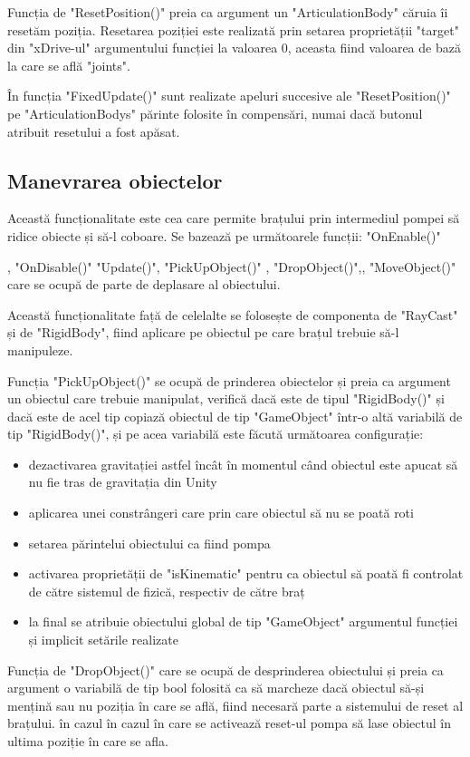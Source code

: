 Funcția de "ResetPosition()" preia ca argument un "ArticulationBody" căruia îi resetăm poziția. Resetarea poziției este realizată prin setarea proprietății "target" din "xDrive-ul" argumentului funcției la valoarea  0, aceasta fiind valoarea de bază la care se află "joints".

În funcția "FixedUpdate()" sunt realizate apeluri succesive ale "ResetPosition()" pe "ArticulationBodys"  părinte folosite în compensări, numai dacă butonul atribuit resetului a fost apăsat.


\subsection{Manevrarea obiectelor}
Această funcționalitate este cea care permite brațului prin intermediul pompei să ridice obiecte și să-l coboare. Se bazează pe următoarele funcții: "OnEnable()" 

, "OnDisable()" "Update()", "PickUpObject()"  , "DropObject()",, "MoveObject()" care se ocupă de parte de deplasare al obiectului.

Această funcționalitate față de celelalte se folosește de componenta de "RayCast" și de "RigidBody", fiind aplicare pe obiectul pe care brațul trebuie să-l manipuleze.

Funcția "PickUpObject()" se ocupă de prinderea obiectelor și preia ca argument un obiectul care trebuie manipulat, verifică dacă este de tipul "RigidBody()" și dacă este de acel tip copiază obiectul de tip "GameObject" într-o altă variabilă de tip "RigidBody()", și pe acea variabilă este făcută următoarea configurație: 

\begin{itemize}
	\item dezactivarea gravitației astfel încât în momentul când obiectul este apucat să nu fie tras de gravitația din Unity
	\item aplicarea unei constrângeri care prin care obiectul să nu se poată roti
	\item setarea părintelui obiectului ca fiind pompa
	\item activarea proprietății de "isKinematic" pentru ca obiectul să poată fi controlat de către sistemul de fizică, respectiv de către braț
	\item la final se atribuie obiectului global de tip "GameObject" argumentul funcției și implicit setările realizate
\end{itemize}

Funcția de "DropObject()"  care se ocupă de desprinderea obiectului și preia ca argument o variabilă de tip bool folosită ca să marcheze dacă obiectul să-și mențină sau nu poziția în care se află, fiind necesară parte a sistemului de reset al brațului. în cazul în cazul în care se activează reset-ul pompa să lase obiectul în ultima poziție în care se afla. 

